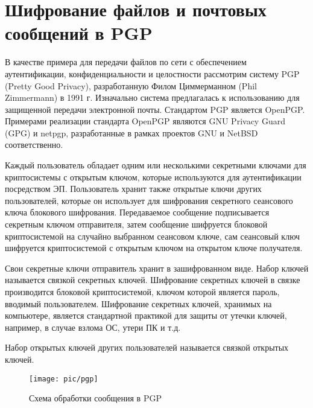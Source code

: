 \section{Шифрование файлов и почтовых сообщений в PGP}

В качестве примера для передачи файлов по сети с обеспечением аутентификации, конфиденциальности и целостности рассмотрим систему PGP (Pretty Good Privacy), разработанную Филом Циммерманном (Phil Zimmermann) в 1991 г. Изначально система предлагалась к использованию для защищенной передачи электронной почты. Стандартом PGP является OpenPGP. Примерами реализации стандарта OpenPGP являются GNU Privacy Guard (GPG) и netpgp, разработанные в рамках проектов GNU и NetBSD соответственно.

Каждый пользователь обладает одним или несколькими секретными ключами для криптосистемы с открытым ключом, которые используются для аутентификации посредством ЭП. Пользователь хранит также открытые ключи других пользователей, которые он использует для шифрования секретного сеансового ключа блокового шифрования. Передаваемое сообщение подписывается секретным ключом отправителя, затем сообщение шифруется блоковой криптосистемой на случайно выбранном сеансовом ключе, сам сеансовый ключ шифруется криптосистемой с открытым ключом на открытом ключе получателя.

Свои секретные ключи отправитель хранит в зашифрованном виде. Набор ключей называется связкой секретных ключей. Шифрование секретных ключей в связке производится блоковой криптосистемой, ключом которой является пароль, вводимый пользователем. Шифрование секретных ключей, хранимых на компьютере, является стандартной практикой для защиты от утечки ключей, например, в случае взлома ОС, утери ПК и т.д.

Набор открытых ключей других пользователей называется связкой открытых ключей.

\begin{figure}[!ht]
	\centering
	\texttt{[image: pic/pgp]}
	\caption{Схема обработки сообщения в PGP\label{fig:pgp}}
\end{figure}

